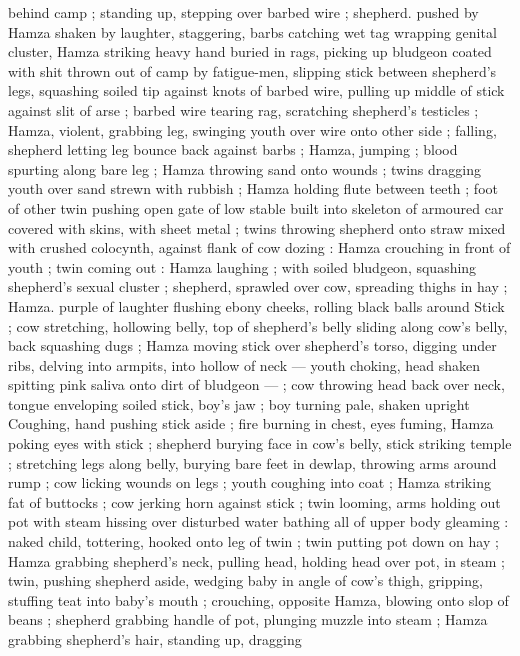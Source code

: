 behind camp ; standing up, stepping over barbed wire ; shepherd. 
pushed by Hamza shaken by laughter, staggering, barbs catching wet 
tag wrapping genital cluster, Hamza striking heavy hand buried in 
rags, picking up bludgeon coated with shit thrown out of camp by 
fatigue-men, slipping stick between shepherd's legs, squashing 
soiled tip against knots of barbed wire, pulling up middle of stick 
against slit of arse ; barbed wire tearing rag, scratching shepherd's 
testicles ; Hamza, violent, grabbing leg, swinging youth over wire 
onto other side ; falling, shepherd letting leg bounce back against 
barbs ; Hamza, jumping ; blood spurting along bare leg ; Hamza 
throwing sand onto wounds ; twins dragging youth over sand strewn 
with rubbish ; Hamza holding flute between teeth ; foot of other twin 
pushing open gate of low stable built into skeleton of armoured car 
covered with skins, with sheet metal ; twins throwing shepherd onto 
straw mixed with crushed colocynth, against flank of cow dozing : 
Hamza crouching in front of youth ; twin coming out : Hamza 
laughing ; with soiled bludgeon, squashing shepherd's sexual cluster 
; shepherd, sprawled over cow, spreading thighs in hay ; Hamza. 
purple of laughter flushing ebony cheeks, rolling black balls around 
Stick ; cow stretching, hollowing belly, top of shepherd's belly sliding 
along cow's belly, back squashing dugs ; Hamza moving stick over 
shepherd's torso, digging under ribs, delving into armpits, into 
hollow of neck --- youth choking, head shaken spitting pink saliva 
onto dirt of bludgeon --- ; cow throwing head back over neck, tongue 
enveloping soiled stick, boy's jaw ; boy turning pale, shaken upright 
Coughing, hand pushing stick aside ; fire burning in chest, eyes 
fuming, Hamza poking eyes with stick ; shepherd burying face in 
cow's belly, stick striking temple ; stretching legs along belly, burying 
bare feet in dewlap, throwing arms around rump ; cow licking wounds 
on legs ; youth coughing into coat ; Hamza striking fat of buttocks ; 
cow jerking horn against stick ; twin looming, arms holding out pot 
with steam hissing over disturbed water bathing all of upper body 
gleaming : naked child, tottering, hooked onto leg of twin ; twin 
putting pot down on hay ; Hamza grabbing shepherd's neck, pulling 
head, holding head over pot, in steam ; twin, pushing shepherd 
aside, wedging baby in angle of cow's thigh, gripping, stuffing teat 
into baby's mouth ; crouching, opposite Hamza, blowing onto slop of 
beans ; shepherd grabbing handle of pot, plunging muzzle into 
steam ; Hamza grabbing shepherd's hair, standing up, dragging 
